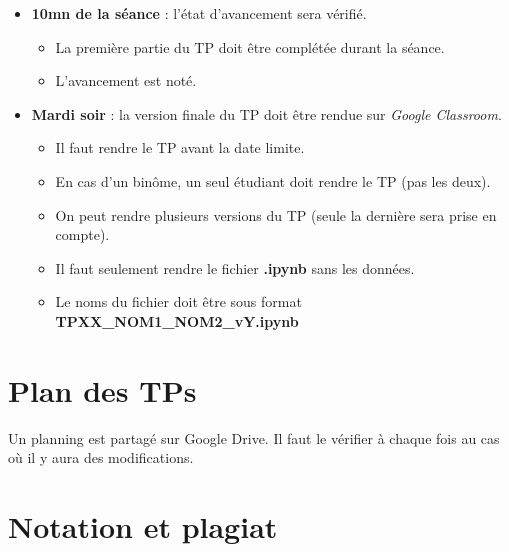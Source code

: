 \documentclass[11pt, a4paper]{article}
\begin{document}
\begin{itemize}
	\item \textbf{10mn de la séance} : l'état d'avancement sera vérifié.
	\begin{itemize}
		\item La première partie du TP doit être complétée durant la séance.
		\item L'avancement est noté.
	\end{itemize}

	\item \textbf{Mardi soir} : la version finale du TP doit être rendue sur \textit{Google Classroom}.
	\begin{itemize}
		\item Il faut rendre le TP avant la date limite.
		\item En cas d'un binôme, un seul étudiant doit rendre le TP (pas les deux).
		\item On peut rendre plusieurs versions du TP (seule la dernière sera prise en compte).
		\item Il faut seulement rendre le fichier \textbf{.ipynb} sans les données.
		\item Le noms du fichier doit être sous format \textbf{TPXX\_NOM1\_NOM2\_vY.ipynb}
	\end{itemize}

\end{itemize}


\section{Plan des TPs}

Un planning est partagé sur Google Drive. 
Il faut le vérifier à chaque fois au cas où il y aura des modifications.


\section{Notation et plagiat}
\end{document}
